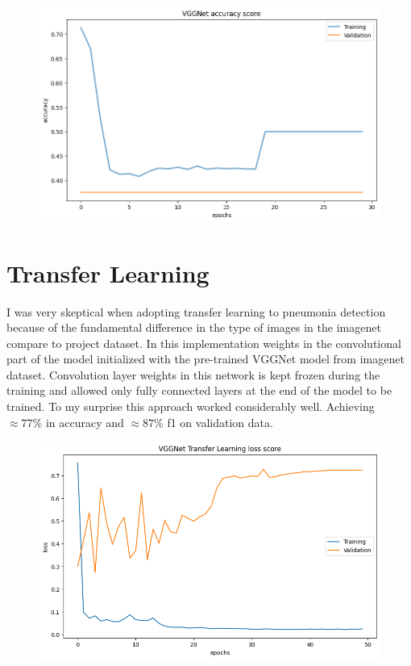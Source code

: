 \begin{figure}[H]
    \centering
    \includegraphics[width=.8\textwidth]{img/vggnetaccuracy.png}
    \caption{}
    \label{fig:vggacc}
\end{figure}


\section{Transfer Learning}
I was very skeptical when adopting transfer learning to pneumonia detection because of the fundamental difference in the type of images in the imagenet compare to project dataset.
In this implementation weights in the convolutional part of the model initialized with the pre-trained VGGNet model from imagenet dataset.
Convolution layer weights in this network is kept frozen during the training and allowed only fully connected layers at the end of the model to be trained.
To my surprise this approach worked considerably well. Achieving $\approx 77 \%$ in accuracy and $\approx 87 \%$ f1 on validation data. 

\begin{figure}[H]
    \centering
    \includegraphics[width=.8\textwidth]{img/vggnettfloss.png}
    \caption{}
    \label{fig:vggtfloss}
\end{figure}

